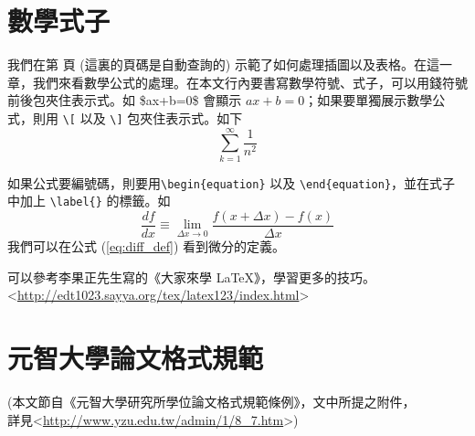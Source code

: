 \chapter{數學式子}
我們在第 \pageref{ch:example} 頁 (這裏的頁碼是自動查詢的) 示範了如何處理插圖以及表格。在這一章，我們來看數學公式的處理。在本文行內要書寫數學符號、式子，可以用錢符號前後包夾住表示式。如 \$ax+b=0\$ 會顯示 $ax+b=0$；如果要單獨展示數學公式，則用 \verb+\[+ 以及 \verb+\]+ 包夾住表示式。如下
\[
\sum_{k=1}^{\infty}\frac{1}{n^2}
\]

如果公式要編號碼，則要用\verb+\begin{equation}+ 以及 \verb+\end{equation}+，並在式子中加上 \verb+\label{}+ 的標籤。如
\begin{equation}
  \frac{df}{dx} \equiv \lim_{\Delta x \rightarrow 0} \frac{f(x+\Delta x) - f(x)}{\Delta x}   \label{eq:diff_def}
\end{equation}
我們可以在公式 (\ref{eq:diff_def}) 看到微分的定義。

可以參考李果正先生寫的《大家來學 {\LaTeX}》，學習更多的技巧。\\
\textless{}\url{http://edt1023.sayya.org/tex/latex123/index.html}\textgreater{}

\chapter{元智大學論文格式規範}
(本文節自《元智大學研究所學位論文格式規範條例》，文中所提之附件，\\
詳見\textless{}\url{http://www.yzu.edu.tw/admin/1/8_7.htm}\textgreater{})

